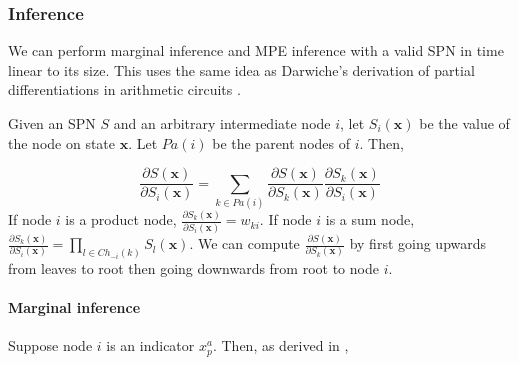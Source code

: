 \documentclass[10pt, titlepage]{article}
\theoremstyle{definition}
\newcommand\mb{\mathbf}
\begin{document}
\subsubsection{Inference}\label{inf}
We can perform marginal inference and MPE inference with a valid SPN in time linear to its size. This uses the same idea as Darwiche's derivation of partial differentiations in arithmetic circuits \cite{darwiche2003differential}.

Given an SPN $S$ and an arbitrary intermediate node $i$, let $S_i(\mb{x})$ be the value of the node on state $\mb{x}$. Let $Pa(i)$ be the parent nodes of $i$. Then,

\begin{equation}
\label{psx}
    \frac{\partial S(\mb{x})}{\partial S_i(\mb{x})}= \sum_{k\in Pa(i)}\frac{\partial S(\mb{x})}{\partial S_k(\mb{x})} \frac{\partial S_k(\mb{x})}{\partial S_i(\mb{x})}
\end{equation}
If node $i$ is a product node, $\frac{\partial S_k(\mb{x})}{\partial S_i(\mb{x})}=w_{ki}$. If node $i$ is a sum node, $\frac{\partial S_k(\mb{x})}{\partial S_i(\mb{x})}=\prod_{l\in Ch_{-i}(k)}S_l(\mb{x})$. We can compute $\frac{\partial S(\mb{x})}{\partial S_k(\mb{x})}$ by first going upwards from leaves to root then going downwards from root to node $i$. 

\paragraph{Marginal inference}\label{if:mg}
Suppose node $i$ is an indicator $x_p^a$. Then, as derived in \cite{darwiche2003differential},
\end{document}
